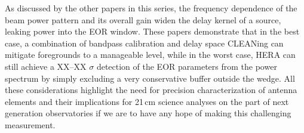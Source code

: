 \documentclass{emulateapj}
\begin{document}
As discussed by the other papers in this series, the frequency dependence of the beam power pattern and its overall gain widen the delay kernel of a source, leaking power into the EOR window. These papers demonstrate that in the best case, a combination of bandpass calibration and delay space CLEANing can mitigate foregrounds to a manageable level, while in the worst case, HERA can still achieve a XX--XX $\sigma$ detection of the EOR parameters from the power spectrum by simply excluding a very conservative buffer outside the wedge. All these considerations highlight the need for precision characterization of antenna elements and their implications for 21\,cm science analyses on the part of next generation observatories if we are to have any hope of making this challenging measurement.









\end{document}
